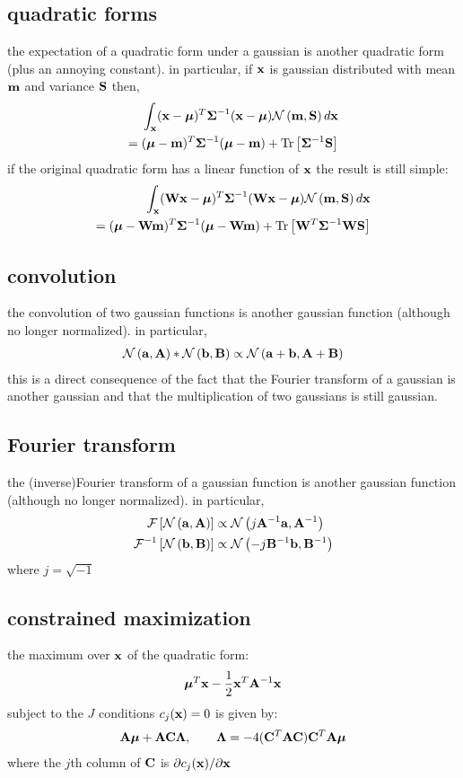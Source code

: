 \documentclass[12pt]{article}
\begin{document}
\subsection{quadratic forms}
the expectation of a quadratic form under a gaussian is another
quadratic form (plus an annoying constant). in particular,
if $\xx$ is gaussian distributed with mean $\mm$ and variance $\SS$ then,
\begin{align}
\int_{\xx}(\xx-\mmm)^T\Sm^{-1}(\xx-\mmm)\normal{\mm}{\SS}d\xx \\
= (\mmm-\mm)^T\Sm^{-1}(\mmm-\mm)+\trace{\Sm^{-1}\SS}
\end{align}
if the original quadratic form has a linear function of $\xx$ the
result is still simple:
\begin{align}
\int_{\xx}(\WW\xx-\mmm)^T\Sm^{-1}(\WW\xx-\mmm)\normal{\mm}{\SS}d\xx \\
= (\mmm-\WW\mm)^T\Sm^{-1}(\mmm-\WW\mm)+\trace{\WW^T\Sm^{-1}\WW\SS}
\end{align}

\subsection{convolution}
the convolution of two gaussian functions is another gaussian function
(although no longer normalized). in particular, 
\begin{align}
\normal{\aaa}{\AA} \ast \normal{\bb}{\BB} \propto \normal{\aaa+\bb}{\AA+\BB}
\end{align}
this is a direct consequence of the fact that the Fourier transform of
a gaussian is another gaussian and that the multiplication of two
gaussians is still gaussian.

\subsection{Fourier transform}
the (inverse)Fourier transform of a gaussian function is another gaussian
function (although no longer normalized). in particular,
\begin{align}
\mathcal{F}\left[\normal{\aaa}{\AA}\right] &\propto
\normal{j\AA^{-1}\aaa}{\AA^{-1}}\\
\mathcal{F}^{-1}\left[\normal{\bb}{\BB}\right] &\propto
\normal{-j\BB^{-1}\bb}{\BB^{-1}}
\end{align}
where $j=\sqrt{-1}$

\subsection{constrained maximization}
the maximum over $\xx$ of the quadratic form:
\begin{align}
\mmm^T\xx - \frac{1}{2}\xx^T\AA^{-1}\xx
\end{align} 
subject to the $J$ conditions $c_j(\xx)=0$  is given by:
\begin{align}
\AA\mmm + \AA\CC\Lm, \qquad \Lm = -4(\CC^T\AA\CC)\CC^T\AA\mmm
\end{align}
where the $j$th column of $\CC$ is $\partial c_j(\xx) / \partial \xx$
\end{document}
